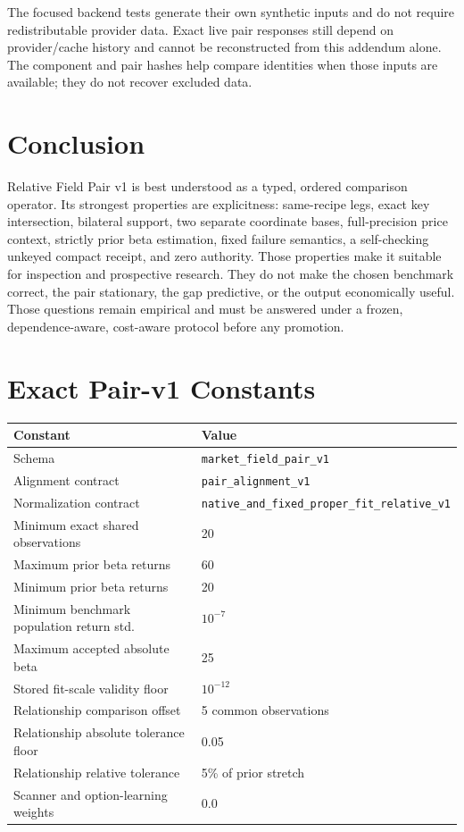 \documentclass{article}
\newcommand{\Pair}{Relative Field Pair v1}
\begin{document}
The focused backend tests generate their own synthetic inputs and do not require redistributable provider data. Exact live pair responses still depend on provider/cache history and cannot be reconstructed from this addendum alone. The component and pair hashes help compare identities when those inputs are available; they do not recover excluded data.

\section{Conclusion}

\Pair{} is best understood as a typed, ordered comparison operator. Its strongest properties are explicitness: same-recipe legs, exact key intersection, bilateral support, two separate coordinate bases, full-precision price context, strictly prior beta estimation, fixed failure semantics, a self-checking unkeyed compact receipt, and zero authority. Those properties make it suitable for inspection and prospective research. They do not make the chosen benchmark correct, the pair stationary, the gap predictive, or the output economically useful. Those questions remain empirical and must be answered under a frozen, dependence-aware, cost-aware protocol before any promotion.




\appendix

\section{Exact Pair-v1 Constants}

\begin{center}
\small
\begin{tabular}{ll}
\toprule
Constant & Value \\
\midrule
Schema & \texttt{market\_field\_pair\_v1} \\
Alignment contract & \texttt{pair\_alignment\_v1} \\
Normalization contract & \texttt{native\_and\_fixed\_proper\_fit\_relative\_v1} \\
Minimum exact shared observations & 20 \\
Maximum prior beta returns & 60 \\
Minimum prior beta returns & 20 \\
Minimum benchmark population return std. & $10^{-7}$ \\
Maximum accepted absolute beta & 25 \\
Stored fit-scale validity floor & $10^{-12}$ \\
Relationship comparison offset & 5 common observations \\
Relationship absolute tolerance floor & 0.05 \\
Relationship relative tolerance & 5\% of prior stretch \\
Scanner and option-learning weights & 0.0 \\
\bottomrule
\end{tabular}
\end{center}
\end{document}

